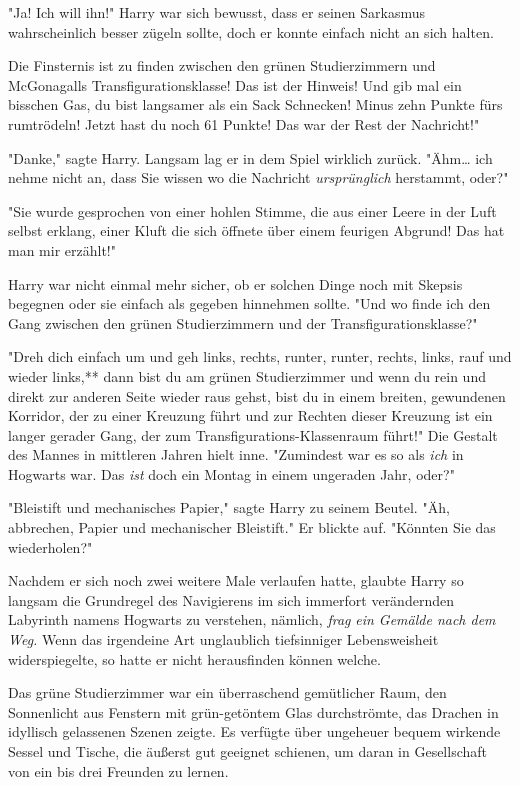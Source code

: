 {"Ja! Ich will ihn!" Harry war sich bewusst, dass er seinen Sarkasmus wahrscheinlich besser zügeln sollte, doch er konnte einfach nicht an sich halten.

Die Finsternis ist zu finden zwischen den grünen Studierzimmern und McGonagalls Transfigurationsklasse! Das ist der Hinweis! Und gib mal ein bisschen Gas, du bist langsamer als ein Sack Schnecken! Minus zehn Punkte fürs rumtrödeln! Jetzt hast du noch 61 Punkte! Das war der Rest der Nachricht!"

"Danke," sagte Harry. Langsam lag er in dem Spiel wirklich zurück. "Ähm… ich nehme nicht an, dass Sie wissen wo die Nachricht \emph{ursprünglich} herstammt, oder?"

"Sie wurde gesprochen von einer hohlen Stimme, die aus einer Leere in der Luft selbst erklang, einer Kluft die sich öffnete über einem feurigen Abgrund! Das hat man mir erzählt!"

Harry war nicht einmal mehr sicher, ob er solchen Dinge noch mit Skepsis begegnen oder sie einfach als gegeben hinnehmen sollte. "Und wo finde ich den Gang zwischen den grünen Studierzimmern und der Transfigurationsklasse?"

"Dreh dich einfach um und geh links, rechts, runter, runter, rechts, links, rauf und wieder links,** dann bist du am grünen Studierzimmer und wenn du rein und direkt zur anderen Seite wieder raus gehst, bist du in einem breiten, gewundenen Korridor, der zu einer Kreuzung führt und zur Rechten dieser Kreuzung ist ein langer gerader Gang, der zum Transfigurations-Klassenraum führt!" Die Gestalt des Mannes in mittleren Jahren hielt inne. "Zumindest war es so als \emph{ich} in Hogwarts war. Das \emph{ist} doch ein Montag in einem ungeraden Jahr, oder?"

"Bleistift und mechanisches Papier," sagte Harry zu seinem Beutel. "Äh, abbrechen, Papier und mechanischer Bleistift." Er blickte auf. "Könnten Sie das wiederholen?"

Nachdem er sich noch zwei weitere Male verlaufen hatte, glaubte Harry so langsam die Grundregel des Navigierens im sich immerfort verändernden Labyrinth namens Hogwarts zu verstehen, nämlich, \emph{frag} \emph{ein Gemälde nach dem Weg.} Wenn das irgendeine Art unglaublich tiefsinniger Lebensweisheit widerspiegelte, so hatte er nicht herausfinden können welche.

Das grüne Studierzimmer war ein überraschend gemütlicher Raum, den Sonnenlicht aus Fenstern mit grün-getöntem Glas durchströmte, das Drachen in idyllisch gelassenen Szenen zeigte. Es verfügte über ungeheuer bequem wirkende Sessel und Tische, die äußerst gut geeignet schienen, um daran in Gesellschaft von ein bis drei Freunden zu lernen.

}
